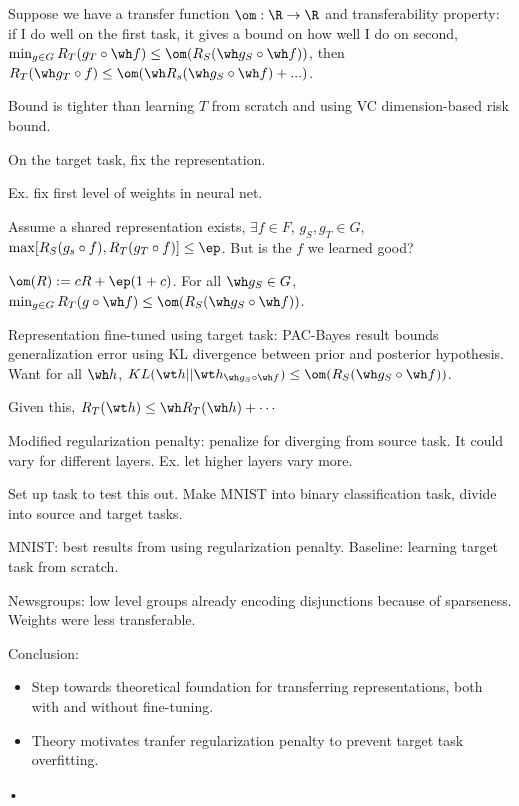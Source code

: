 \begin{thm}
Suppose we have a transfer function $\om:\R\to \R$ and transferability property: if I do well on the first task, it gives a bound on how well I do on second, $\min_{g\in G} R_T(g_T\circ \wh f) \le \om(R_S(\wh g_S\circ \wh f))$, then $R_T(\wh g_T\circ f) \le \om(\wh R_s(\wh g_S\circ \wh f)+...)$.
\end{thm}
Bound is tighter than learning $T$ from scratch and using VC dimension-based risk bound.

On the target task, fix the representation.

Ex. fix first level of weights in neural net. %

Assume a shared representation exists, $\exists f\in F$, $g_S,g_T\in G$, $\max[R_S(g_s\circ f), R_T(g_T\circ f)]\le \ep$. But is the $f$ we learned good?

\begin{thm}
$\om(R):=cR + \ep(1+c)$.  For all $\wh g_S\in G$, $\min_{g\in G}R_T(g\circ \wh f)\le \om(R_S(\wh g_S\circ \wh f))$.
\end{thm}

Representation fine-tuned using target task: PAC-Bayes result bounds generalization error using KL divergence between prior and posterior hypothesis. Want for all $\wh h$, $KL(\wt h||\wt h_{\wh g_S\circ \wh f}) \le \om(R_S(\wh g_S\circ \wh f))$.

\begin{thm}
Given this, $R_T(\wt h)\le \wh R_T(\wh h)+\cdots$
\end{thm}

Modified regularization penalty: penalize for diverging from source task. It could vary for different layers. Ex. let higher layers vary more.

Set up task to test this out. Make MNIST into binary classification task, divide into source and target tasks.

MNIST: best results from using regularization penalty. Baseline: learning target task from scratch. 

Newsgroups: low level groups already encoding disjunctions because of sparseness. Weights were less transferable.

Conclusion: 
\begin{itemize}
\item
Step towards theoretical foundation for transferring representations, both with and without fine-tuning.
\item
Theory motivates tranfer regularization penalty to prevent target task overfitting.
\end{itemize}•


